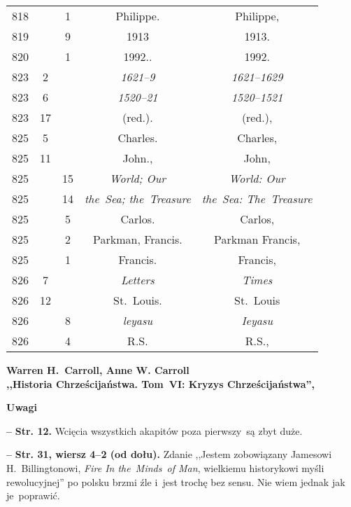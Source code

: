 \documentclass[a4paper,11pt]{article}  %
\newcommand{\spaceTwo}{2em}
\newcommand{\spaceFour}{0.5em}
\newcommand{\tb}{\textbf}
\newcommand{\noi}{\noindent}
\newcommand{\start}{\noi \tb{--} {}}
\newcommand{\Str}[1]{\tb{Str. #1.}}
\newcommand{\StrWd}[2]{\tb{Str. #1, wiersz #2 (od dołu).}}
\newcommand{\Center}[1]{\begin{center} #1 \end{center}}
\newcommand{\CenterTB}[1]{\Center{\tb{#1}}}
\newcommand{\Work}[1]{ \begin{center} {\large \tb{#1}} \end{center} }
\begin{document}
\begin{center}
\begin{tabular}{|c|c|c|c|c|}
    818 & &  1 & Philippe. & Philippe, \\
    819 & &  9 & 1913 & 1913. \\
    820 & &  1 & 1992.. & 1992. \\
    823 &  2 & & \emph{1621--9} & \emph{1621--1629} \\
    823 &  6 & & \emph{1520--21} & \emph{1520--1521} \\
    823 & 17 & & (red.). & (red.), \\
    825 &  5 & & Charles. & Charles, \\
    825 & 11 & & John., & John, \\
    825 & & 15 & \emph{World; Our} & \emph{World: Our} \\
    825 & & 14 & \emph{the~Sea; the~Treasure} & \emph{the~Sea:
                                                The~Treasure} \\
    825 & &  5 & Carlos. & Carlos, \\
    825 & &  2 & Parkman, Francis. & Parkman Francis, \\
    825 & &  1 & Francis. & Francis, \\
    826 &  7 & & \emph{Letters} & \emph{Times} \\
    826 & 12 & & St.~Louis. & St.~Louis \\
    826 & &  8 & \emph{leyasu} & \emph{Ieyasu} \\
    826 & &  4 & R.S. & R.S., \\
    \hline
  \end{tabular}
\end{center}

\vspace{\spaceTwo}





\Work{
  Warren H.~Carroll, Anne W. Carroll \\
  ,,Historia Chrześcijaństwa. Tom~VI: Kryzys Chrześcijaństwa'',
  \cite{CarrollHistoriaChrzecijanstwaTomVI14} }


\CenterTB{Uwagi}

\start \Str{12} Wcięcia wszystkich akapitów poza pierwszy~są zbyt
duże.

\vspace{\spaceFour}


\start \StrWd{31}{4--2} Zdanie ,,Jestem zobowiązany Jamesowi
H.~Billingtonowi, \emph{Fire In the~Minds~of Man}, wielkiemu
historykowi myśli rewolucyjnej'' po polsku brzmi źle i~jest trochę bez
sensu. Nie wiem jednak jak je~poprawić.
\end{document}
